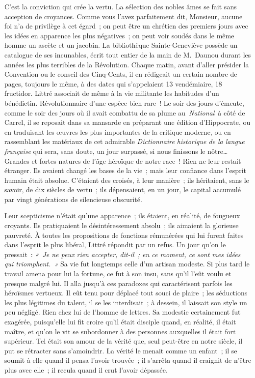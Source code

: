 \documentclass[french,twoside]{book} %
\newcommand\orgName[1]{#1}
\newcommand\persName[1]{#1}
\newcommand\placeName[1]{#1}
\begin{document}
C’est la conviction qui crée la vertu. La sélection des nobles âmes se fait sans acception de croyances. Comme vous l’avez parfaitement dit, Monsieur, aucune foi n’a de privilège à cet égard ; on peut être un chrétien des premiers jours avec les idées en apparence les plus négatives ; on peut voir soudés dans le même homme un ascète et un jacobin. La {\placeName bibliothèque Sainte-Geneviève} possède un catalogue de ses incunables, écrit tout entier de la main de {\persName M. Daunou} durant les années les plus terribles de la Révolution. Chaque matin, avant d’aller présider la {\orgName Convention} ou le {\orgName conseil des Cinq-Cents}, il en rédigeait un certain nombre de pages, toujours le même, à des dates qui s’appelaient 13 vendémiaire, 18 fructidor. {\persName Littré} associait de même à la vie militante les habitudes d’un bénédictin. Révolutionnaire d’une espèce bien rare ! Le soir des jours d’émeute, comme le soir des jours où il avait combattu de sa plume au \emph{National} à côté de {\persName Carrel}, il se reposait dans sa mansarde en préparant une édition d’{\persName Hippocrate}, ou en traduisant les œuvres les plus importantes de la critique moderne, ou en rassemblant les matériaux de cet admirable \emph{Dictionnaire historique de la langue française} qui sera, sans doute, un jour surpassé, si nous finissons le nôtre… Grandes et fortes natures de l’âge héroïque de notre race ! Rien ne leur restait étranger. Ils avaient changé les bases de la vie ; mais leur confiance dans l’esprit humain était absolue. C’étaient des croisés, à leur manière ; ils héritaient, sans le savoir, de dix siècles de vertu ; ils dépensaient, en un jour, le capital accumulé par vingt générations de silencieuse obscurité.\par
Leur scepticisme n’était qu’une apparence ; ils étaient, en réalité, de fougueux croyants. Ils pratiquaient le désintéressement absolu ; ils aimaient la glorieuse pauvreté. À toutes les propositions de fonctions rémunérées qui lui furent faites dans l’esprit le plus libéral, {\persName Littré} répondit par un refus. Un jour qu’on le pressait : \emph{« Je ne peux rien accepter, dit-il ; en ce moment, ce sont mes idées qui triomphent. »} Sa vie fut longtemps celle d’un artisan modeste. Si plus tard le travail amena pour lui la fortune, ce fut à son insu, sans qu’il l’eût voulu et presque malgré lui. Il alla jusqu’à ces paradoxes qui caractérisent parfois les héroïsmes vertueux. Il eût tenu pour déplacé tout souci de plaire ; les séductions les plus légitimes du talent, il se les interdisait ; à dessein, il laissait son style un peu négligé. Rien chez lui de l’homme de lettres. Sa modestie certainement fut exagérée, puisqu’elle lui fit croire qu’il était disciple quand, en réalité, il était maître, et qu’on le vit se subordonner à des personnes auxquelles il était fort supérieur. Tel était son amour de la vérité que, seul peut-être en notre siècle, il put se rétracter sans s’amoindrir. La vérité le menait comme un enfant ; il se soumit à elle quand il pensa l’avoir trouvée ; il s’arrêta quand il craignit de n’être plus avec elle ; il recula quand il crut l’avoir dépassée.\par
\end{document}
